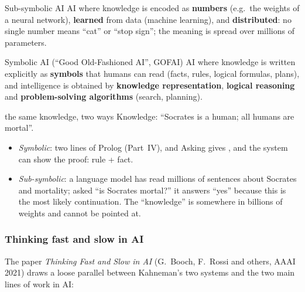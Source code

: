 \begin{nbdef}{Sub-symbolic AI}
AI where knowledge is encoded as \textbf{numbers} (e.g.\ the weights of a neural network),
\textbf{learned} from data (machine learning), and \textbf{distributed}: no single number
means ``cat'' or ``stop sign''; the meaning is spread over millions of parameters.
\end{nbdef}

\begin{nbdef}{Symbolic AI (``Good Old-Fashioned AI'', GOFAI)}
AI where knowledge is written explicitly as \textbf{symbols} that humans can read (facts,
rules, logical formulas, plans), and intelligence is obtained by \textbf{knowledge
representation}, \textbf{logical reasoning} and \textbf{problem-solving algorithms}
(search, planning).
\end{nbdef}

\begin{nbexample}{the same knowledge, two ways}
Knowledge: ``Socrates is a human; all humans are mortal''.
\begin{itemize}[nosep]
  \item \emph{Symbolic}: two lines of Prolog (Part~IV),
         and 
        Asking  gives , and the system can show the
        proof: rule + fact.
  \item \emph{Sub-symbolic}: a language model has read millions of sentences about
        Socrates and mortality; asked ``is Socrates mortal?'' it answers ``yes'' because
        this is the most likely continuation. The ``knowledge'' is somewhere in billions of
        weights and cannot be pointed at.
\end{itemize}
\end{nbexample}

\subsubsection{Thinking fast and slow in AI}

The paper \emph{Thinking Fast and Slow in AI} (G.~Booch, F.~Rossi and others, AAAI 2021)
draws a loose parallel between Kahneman's two systems and the two main lines of work in AI:

